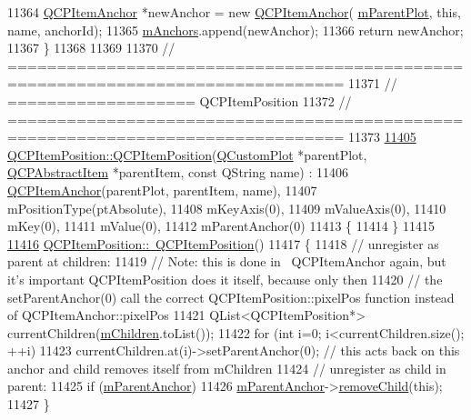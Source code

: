 \begin{DoxyCode}
11364   \hyperlink{a00032}{QCPItemAnchor} *newAnchor = \textcolor{keyword}{new} \hyperlink{a00022_a61767d414fd57af9eb1741b34268c7fc}{QCPItemAnchor}(
      \hyperlink{a00044_aa2a528433e44db02b8aef23c1f9f90ed}{mParentPlot}, \textcolor{keyword}{this}, name, anchorId);
11365   \hyperlink{a00022_a909a3abab783de302ebf0a0e6f2bbc15}{mAnchors}.append(newAnchor);
11366   \textcolor{keywordflow}{return} newAnchor;
11367 \}
11368 
11369 
11370 \textcolor{comment}{// ================================================================================}
11371 \textcolor{comment}{// =================== QCPItemPosition}
11372 \textcolor{comment}{// ================================================================================}
11373 
\hypertarget{a00115_source_l11405}{}\hyperlink{a00038_a3efc524f37fdcd22907545eb77555ce4}{11405} \hyperlink{a00038_a3efc524f37fdcd22907545eb77555ce4}{QCPItemPosition::QCPItemPosition}(\hyperlink{a00030_d8/d00/a00186}{QCustomPlot} *parentPlot, 
      \hyperlink{a00022}{QCPAbstractItem} *parentItem, \textcolor{keyword}{const} QString name) :
11406   \hyperlink{a00032}{QCPItemAnchor}(parentPlot, parentItem, name),
11407   mPositionType(ptAbsolute),
11408   mKeyAxis(0),
11409   mValueAxis(0),
11410   mKey(0),
11411   mValue(0),
11412   mParentAnchor(0)
11413 \{
11414 \}
11415 
\hypertarget{a00115_source_l11416}{}\hyperlink{a00038_ad8a289016f7a62332f9c865c39ab2047}{11416} \hyperlink{a00038_ad8a289016f7a62332f9c865c39ab2047}{QCPItemPosition::~QCPItemPosition}()
11417 \{
11418   \textcolor{comment}{// unregister as parent at children:}
11419   \textcolor{comment}{// Note: this is done in ~QCPItemAnchor again, but it's important QCPItemPosition does it itself, because
       only then}
11420   \textcolor{comment}{//       the setParentAnchor(0) call the correct QCPItemPosition::pixelPos function instead of
       QCPItemAnchor::pixelPos}
11421   QList<QCPItemPosition*> currentChildren(\hyperlink{a00032_a5f0e67f395a63e2dd0e29ff1dcaf37b7}{mChildren}.toList());
11422   \textcolor{keywordflow}{for} (\textcolor{keywordtype}{int} i=0; i<currentChildren.size(); ++i)
11423     currentChildren.at(i)->setParentAnchor(0); \textcolor{comment}{// this acts back on this anchor and child removes itself
       from mChildren}
11424   \textcolor{comment}{// unregister as child in parent:}
11425   \textcolor{keywordflow}{if} (\hyperlink{a00038_a21e37c5a8cabe747a2c60773b23eddeb}{mParentAnchor})
11426     \hyperlink{a00038_a21e37c5a8cabe747a2c60773b23eddeb}{mParentAnchor}->\hyperlink{a00032_ab65ec61984575f737f43c2bb59dd0d76}{removeChild}(\textcolor{keyword}{this});
11427 \}

\end{DoxyCode}

